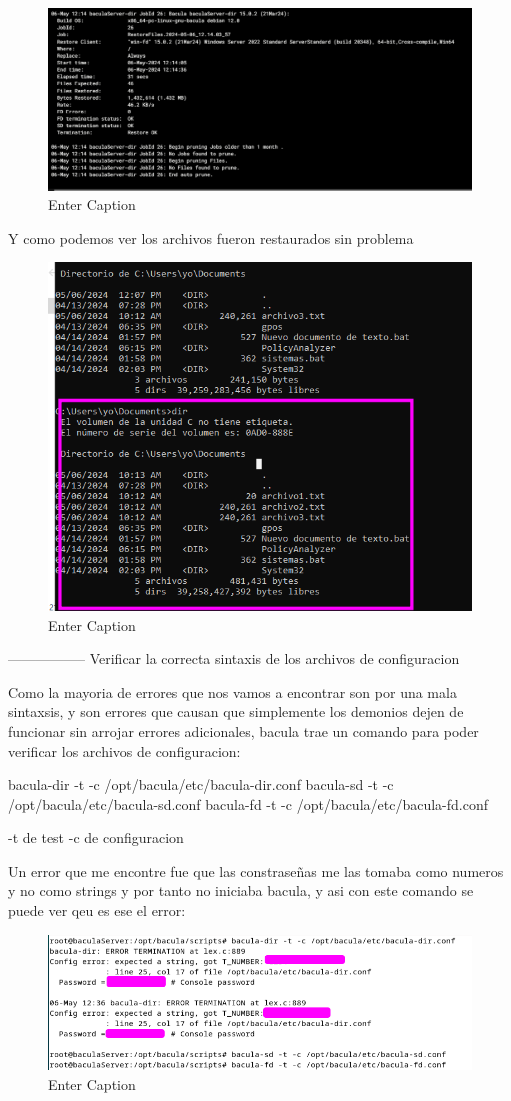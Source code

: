 \begin{figure}[H]
    \centering
    \includegraphics[width=0.5\linewidth]{instalacionBacula/restoreWIndows.png}
    \caption{Enter Caption}
\end{figure}

Y como podemos ver los archivos fueron restaurados sin problema

\begin{figure}[H]
    \centering
    \includegraphics[width=0.5\linewidth]{instalacionBacula/restauracionWinCompleta.png}
    \caption{Enter Caption}
\end{figure}

-----------------
Verificar la correcta sintaxis de los archivos de configuracion

Como la mayoria de errores que nos vamos a encontrar son por una mala sintaxsis, y son errores que causan que simplemente los demonios dejen de funcionar sin arrojar errores adicionales, bacula trae un comando para poder verificar los archivos de configuracion:


bacula-dir -t -c /opt/bacula/etc/bacula-dir.conf
bacula-sd -t -c /opt/bacula/etc/bacula-sd.conf
bacula-fd -t -c /opt/bacula/etc/bacula-fd.conf

-t de test
-c de configuracion

Un error que me encontre fue que las constraseñas me las tomaba como numeros y no como strings y por tanto no iniciaba bacula, y asi con este comando se puede ver qeu es ese el error:
\begin{figure}[H]
    \centering
    \includegraphics[width=0.5\linewidth]{instalacionBacula/verificacionSintaxsis.png}
    \caption{Enter Caption}
\end{figure}

